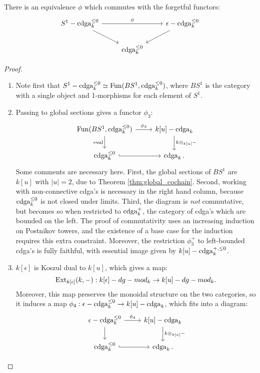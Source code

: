 \begin{thm}
There is an equivalence $\phi$ which commutes with the forgetful functors:
\[
\begin{tikzcd}
S^1 - \cdga_k^{\leq 0}\arrow{rr}{\phi}\arrow{dr} & & \epsilon - \cdga_k^{\leq 0}\arrow{dl} \\
 & \cdga_k^{\leq 0} & 
\end{tikzcd}
\]
\end{thm}
\begin{proof}
   
\begin{enumerate}
\item Note first that $S^1-\operatorname{cdga}_k^{\leq 0} \simeq \operatorname{Fun}(BS^1, \operatorname{cdga}_k^{\leq 0})$, where $BS^1$ is the category with a single
object and 1-morphisms for each element of $S^1$.
\item Passing to global sections gives a functor $\phi_3$:
\[
\begin{tikzcd}
\Fun(BS^1, \cdga_k^{\leq 0})\arrow{r}{\phi_3}\arrow[swap]{d}{\text{eval}} & k[u]-\cdga_k\arrow{d}{k\otimes_{k[u]} -} \\
\cdga_k^{\leq 0}\arrow[hook]{r} & \cdga_k .
\end{tikzcd}
\]
Some comments are necessary here. First, the global sections of $BS^1$ are $k[u]$ with $|u| = 2$, due to Theorem
\ref{thm:global_cochain}. Second, working with non-connective cdga's is necessary in the right hand column, because
$\operatorname{cdga}_k^{\leq 0}$ is not closed under limits. Third, the diagram is \emph{not} commutative, but becomes so when restricted
to $\operatorname{cdga}^+_k$, the category of cdga's which are bounded on the left. The proof of commutativity uses an increasing induction
on Postnikov towers, and the existence of a base case for the induction requires this extra constraint. Moreover,
the restriction $\phi_3^+$ to left-bounded cdga's is fully faithful, with essential image given by $k[u]-\operatorname{cdga}_k^{+,\leq 0}$.
\item $k[\epsilon]$ is Koszul dual to $k[u]$, which gives a map:
\[	\operatorname{Ext}_{k[\epsilon]}(k,-) : k[\epsilon] - dg-mod_k \to k[u] - dg-mod_k.	\]
Moreover, this map preserves the monoidal structure on the two categories, so it induces a map $\phi_4: \epsilon-\operatorname{cdga}_k^{\leq 0}
\to k[u] -\operatorname{cdga}_k$, which fits into a diagram:
\[
\begin{tikzcd}
\epsilon-\cdga_k^{\leq 0}\arrow{r}{\phi_4}\arrow{d} & k[u]-\cdga_k\arrow{d}{k\otimes_{k[u]} -} \\
\cdga_k^{\leq 0}\arrow[hook]{r} & \cdga_k .
\end{tikzcd}
\]
\end{enumerate}
\end{proof}
